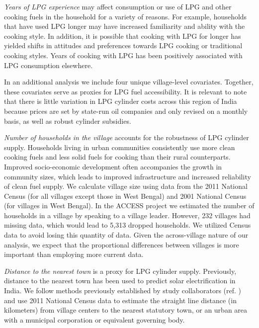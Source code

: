 \documentclass[11pt,english]{article}
\theoremstyle{plain} \newtheorem{claim}{Claim}
\theoremstyle{plain} \newtheorem{prop}{Proposition}
\theoremstyle{plain} \newtheorem{hypo}{Hypothesis}
\begin{document}
\textit{Years of LPG experience} may affect consumption or use of LPG and other cooking fuels in the household for a variety of reasons. For example, households that have used LPG longer may have increased familiarity and ability with the cooking style. In addition, it is possible that cooking with LPG for longer has yielded shifts in attitudes and preferences towards LPG cooking or traditional cooking styles. Years of cooking with LPG has been positively associated with LPG consumption elsewhere\citep{Dickinsonetal2019,Dalabaetal2018,Tripathietal2020}.

In an additional analysis we include four unique village-level covariates. Together, these covariates serve as proxies for LPG fuel accessibility. It is relevant to note that there is little variation in LPG cylinder costs across this region of India because prices are set by state-run oil companies and only revised on a monthly basis, as well as robust cylinder subsidies.

\textit{Number of households in the village} accounts for the robustness of LPG cylinder supply. Households living in urban communities consistently use more clean cooking fuels and less solid fuels for cooking than their rural counterparts. Improved socio-economic development often accompanies the growth in community sizes, which leads to improved infrastructure and increased reliability of clean fuel supply\citep{RaoReddy2007}. We calculate village size using data from the 2011 National Census (for all villages except those in West Bengal) and 2001 National Census (for villages in West Bengal). In the ACCESS project we estimated the number of households in a village by speaking to a village leader. However, 232 villages had missing data, which would lead to 5,313 dropped households. We utilized Census data to avoid losing this quantity of data. Given the across-village nature of our analysis, we expect that the proportional differences between villages is more important than employing more current data. 

\textit{Distance to the nearest town} is a proxy for LPG cylinder supply. Previously, distance to the nearest town has been used to predict solar electrification in India\citep{Aklinetal2018}. We follow methods previously established by study collaborators (ref. \citep{Aklinetal2018}) and use 2011 National Census data to estimate the straight line distance (in kilometers) from village centers to the nearest statutory town, or an urban area with a municipal corporation or equivalent governing body.
\end{document}
